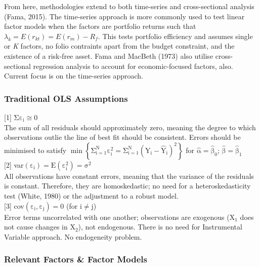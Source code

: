 \documentclass[11pt, english]{article}
\begin{document}
        From here, methodologies extend to both time-series and cross-sectional analysis (Fama, 2015). The time-series approach is more commonly used to test linear factor models when the factors are portfolio returns such that $\lambda_k=E(r_{kt})=E(r_m)-R_f$. This tests portfolio efficiency and assumes single or \textit{K} factors, no folio contraints apart from the budget constraint, and the existence of a risk-free asset. Fama and MacBeth (1973) also utilise cross-sectional regression analysis to account for economic-focused factors, also. Current focus is on the time-series approach.

		\subsubsection*{Traditional OLS Assumptions}

        [1] $\mathrm{\Sigma\varepsilon_i\cong0}$\\

        The sum of all residuals should approximately zero, meaning the degree to which observations outlie the line of best fit should be consistent. Errors should be minimised to satisfy $\mathrm{\min\left\{\Sigma_{i=1}^N\varepsilon_i^2=\Sigma_{i=1}^N\left(Y_i-\hat{Y}_i\right)^2\right\}}$ for $\mathrm{\hat{\alpha}=\hat{\beta}_0}$; $\mathrm{\hat{\beta}=\hat{\beta}_1}$\\

        [2] var$\mathrm{(\varepsilon_i)=E(\varepsilon_i^2)=\sigma^2}$\\

        All observations have constant errors, meaning that the variance of the residuals is constant. Therefore, they are homoskedastic; no need for a heteroskedasticity test (White, 1980) or the adjustment to a robust model.\\

        [3] cov$\mathrm{(\varepsilon_i,\varepsilon_j)=0}$ (for $\mathrm{i\neq j}$)\\

        Error terms uncorrelated with one another; observations are exogenous (X$_1$ does not cause changes in X$_2$), not endogenous. There is no need for Instrumental Variable approach. No endogeneity problem.

		\subsubsection*{Relevant Factors \& Factor Models}
\end{document}
